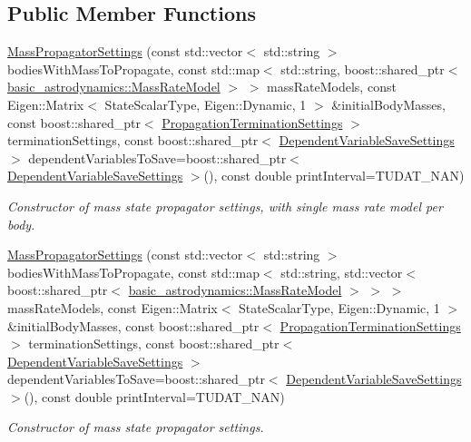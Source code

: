 \subsection*{Public Member Functions}
\begin{DoxyCompactItemize}
\item 
\hyperlink{classtudat_1_1propagators_1_1MassPropagatorSettings_a333acfa4187f05d3afd95643c5507381}{Mass\+Propagator\+Settings} (const std\+::vector$<$ std\+::string $>$ bodies\+With\+Mass\+To\+Propagate, const std\+::map$<$ std\+::string, boost\+::shared\+\_\+ptr$<$ \hyperlink{classtudat_1_1basic__astrodynamics_1_1MassRateModel}{basic\+\_\+astrodynamics\+::\+Mass\+Rate\+Model} $>$ $>$ mass\+Rate\+Models, const Eigen\+::\+Matrix$<$ State\+Scalar\+Type, Eigen\+::\+Dynamic, 1 $>$ \&initial\+Body\+Masses, const boost\+::shared\+\_\+ptr$<$ \hyperlink{classtudat_1_1propagators_1_1PropagationTerminationSettings}{Propagation\+Termination\+Settings} $>$ termination\+Settings, const boost\+::shared\+\_\+ptr$<$ \hyperlink{classtudat_1_1propagators_1_1DependentVariableSaveSettings}{Dependent\+Variable\+Save\+Settings} $>$ dependent\+Variables\+To\+Save=boost\+::shared\+\_\+ptr$<$ \hyperlink{classtudat_1_1propagators_1_1DependentVariableSaveSettings}{Dependent\+Variable\+Save\+Settings} $>$(), const double print\+Interval=T\+U\+D\+A\+T\+\_\+\+N\+AN)
\begin{DoxyCompactList}\small\item\em Constructor of mass state propagator settings, with single mass rate model per body. \end{DoxyCompactList}\item 
\hyperlink{classtudat_1_1propagators_1_1MassPropagatorSettings_a3befd07b3c8b0534d3126156b243d6ac}{Mass\+Propagator\+Settings} (const std\+::vector$<$ std\+::string $>$ bodies\+With\+Mass\+To\+Propagate, const std\+::map$<$ std\+::string, std\+::vector$<$ boost\+::shared\+\_\+ptr$<$ \hyperlink{classtudat_1_1basic__astrodynamics_1_1MassRateModel}{basic\+\_\+astrodynamics\+::\+Mass\+Rate\+Model} $>$ $>$ $>$ mass\+Rate\+Models, const Eigen\+::\+Matrix$<$ State\+Scalar\+Type, Eigen\+::\+Dynamic, 1 $>$ \&initial\+Body\+Masses, const boost\+::shared\+\_\+ptr$<$ \hyperlink{classtudat_1_1propagators_1_1PropagationTerminationSettings}{Propagation\+Termination\+Settings} $>$ termination\+Settings, const boost\+::shared\+\_\+ptr$<$ \hyperlink{classtudat_1_1propagators_1_1DependentVariableSaveSettings}{Dependent\+Variable\+Save\+Settings} $>$ dependent\+Variables\+To\+Save=boost\+::shared\+\_\+ptr$<$ \hyperlink{classtudat_1_1propagators_1_1DependentVariableSaveSettings}{Dependent\+Variable\+Save\+Settings} $>$(), const double print\+Interval=T\+U\+D\+A\+T\+\_\+\+N\+AN)
\begin{DoxyCompactList}\small\item\em Constructor of mass state propagator settings. \end{DoxyCompactList}\end{DoxyCompactItemize}
